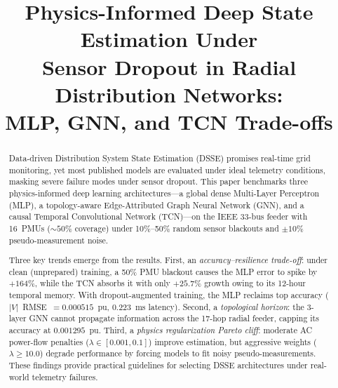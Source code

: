 \documentclass[conference]{IEEEtran}
\begin{document}
\title{Physics-Informed Deep State Estimation Under\\Sensor Dropout in Radial Distribution Networks:\\MLP, GNN, and TCN Trade-offs}

\author{
}

\maketitle

\begin{abstract}
Data-driven Distribution System State Estimation (DSSE) promises real-time grid monitoring, yet most published models are evaluated under ideal telemetry conditions, masking severe failure modes under sensor dropout. This paper benchmarks three physics-informed deep learning architectures---a global dense Multi-Layer Perceptron (MLP), a topology-aware Edge-Attributed Graph Neural Network (GNN), and a causal Temporal Convolutional Network (TCN)---on the IEEE 33-bus feeder with 16~PMUs (${\sim}50\%$ coverage) under 10\%--50\% random sensor blackouts and ${\pm}10\%$ pseudo-measurement noise.

Three key trends emerge from the results. First, an \textit{accuracy--resilience trade-off}: under clean (unprepared) training, a 50\% PMU blackout causes the MLP error to spike by $+164\%$, while the TCN absorbs it with only $+25.7\%$ growth owing to its 12-hour temporal memory. With dropout-augmented training, the MLP reclaims top accuracy ($|V|$~RMSE~$=0.000515$~pu, $0.223$~ms latency). Second, a \textit{topological horizon}: the 3-layer GNN cannot propagate information across the 17-hop radial feeder, capping its accuracy at $0.001295$~pu. Third, a \textit{physics regularization Pareto cliff}: moderate AC power-flow penalties ($\lambda \in [0.001, 0.1]$) improve estimation, but aggressive weights ($\lambda \ge 10.0$) degrade performance by forcing models to fit noisy pseudo-measurements. These findings provide practical guidelines for selecting DSSE architectures under real-world telemetry failures.
\end{abstract}
\end{document}
